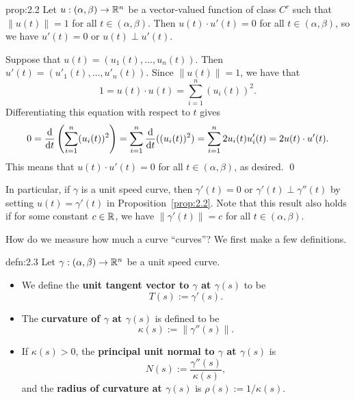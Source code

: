 \begin{prop}{prop:2.2}
    Let $u : (\alpha, \beta) \to \mathbb{R}^n$ be a vector-valued function of class $C^r$ 
    such that $\|u(t)\| = 1$ for all $t \in (\alpha, \beta)$. Then 
    $u(t) \cdot u'(t) = 0$ for all $t \in (\alpha, \beta)$, so
    we have $u'(t) = 0$ or $u(t) \perp u'(t)$.
\end{prop}\vspace{-0.25cm} 
\begin{pf}
    Suppose that $u(t) = (u_1(t), \dots, u_n(t))$. Then 
    $u'(t) = (u'_1(t), \dots, u'_n(t))$. Since $\|u(t)\| = 1$, we have that 
    \[ 1 = u(t) \cdot u(t) = \sum_{i=1}^n (u_i(t))^2. \]
    Differentiating this equation with respect to $t$ gives 
    \begin{align*}
        0 = \frac{\rm d}{{\rm d}t} \left( \sum_{i=1}^n (u_i(t))^2 \right)
        = \sum_{i=1}^n \frac{\rm d}{{\rm d}t} ((u_i(t))^2) 
        = \sum_{i=1}^n 2u_i(t)u'_i(t) = 2u(t) \cdot u'(t). 
    \end{align*}
    This means that $u(t) \cdot u'(t) = 0$ for all $t \in (\alpha, \beta)$, 
    as desired. \qed 
\end{pf}\vspace{-0.25cm} 

In particular, if $\gamma$ is a unit speed curve, then $\gamma'(t) = 0$ 
or $\gamma'(t) \perp \gamma''(t)$ by setting $u(t) = \gamma'(t)$ in 
Proposition~\ref{prop:2.2}. Note that this result also holds if for 
some constant $c \in \mathbb{R}$, we have $\|\gamma'(t)\| = c$ for all $t \in (\alpha, \beta)$.

How do we measure how much a curve ``curves''? We first make a few definitions.

\begin{defn}{defn:2.3}
    Let $\gamma : (\alpha, \beta) \to \mathbb{R}^n$ be a unit speed curve. 
    \begin{itemize}
        \item We define the {\bf unit tangent vector to $\gamma$ at $\gamma(s)$} 
        to be 
        \[ T(s) := \gamma'(s). \] 
        \item The {\bf curvature of $\gamma$ at $\gamma(s)$} is defined to be 
        \[ \kappa(s) := \|\gamma''(s)\|. \] 
        \item If $\kappa(s) > 0$, the {\bf principal unit normal to $\gamma$ 
        at $\gamma(s)$} is 
        \[ N(s) := \frac{\gamma''(s)}{\kappa(s)}, \] 
        and the {\bf radius of curvature at $\gamma(s)$} is $\rho(s) := 1/\kappa(s)$. 
    \end{itemize}
\end{defn}

